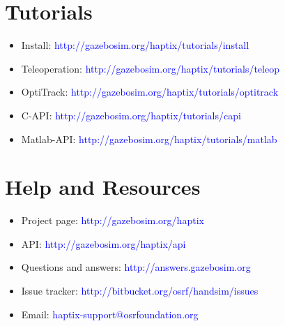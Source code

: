 \documentclass[11pt, letterpaper, landscape]{article}
\begin{document}
\begin{figure}[!htb]
  \centering
  \begin{minipage}[t]{0.48\textwidth}
    \begin{tcolorbox}[height=5cm,colback=gray!8,colframe=gray!15]
      \section*{Tutorials}
      \begin{itemize}
        \item Install: \textcolor{blue}{http://gazebosim.org/haptix/tutorials/install}
        \item Teleoperation: \textcolor{blue}{http://gazebosim.org/haptix/tutorials/teleop}
        \item OptiTrack: \textcolor{blue}{http://gazebosim.org/haptix/tutorials/optitrack}
        \item C-API: \textcolor{blue}{http://gazebosim.org/haptix/tutorials/capi}
        \item Matlab-API: \textcolor{blue}{http://gazebosim.org/haptix/tutorials/matlab}
      \end{itemize}
    \end{tcolorbox}
  \end{minipage}%
  \hspace{0.02\textwidth}%
  \begin{minipage}[t]{0.48\textwidth}
    \begin{tcolorbox}[height=5cm,colback=gray!8,colframe=gray!15]
      \section*{Help and Resources}
      \begin{itemize}
        \item Project page: \textcolor{blue}{http://gazebosim.org/haptix}
        \item API: \textcolor{blue}{http://gazebosim.org/haptix/api}
        \item Questions and answers: \textcolor{blue}{http://answers.gazebosim.org}
        \item Issue tracker: \textcolor{blue}{http://bitbucket.org/osrf/handsim/issues}
        \item Email: \textcolor{blue}{haptix-support@osrfoundation.org}
      \end{itemize}

    \end{tcolorbox}
  \end{minipage}
\end{figure}
\end{document}
